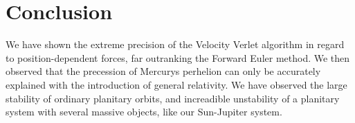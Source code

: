 \documentclass[a4paper]{article}
\begin{document}
\section{Conclusion}\label{sec:conclusion}
We have shown the extreme precision of the Velocity Verlet algorithm in regard to position-dependent forces, far outranking the Forward Euler method.
We then observed that the precession of Mercurys perhelion can only be accurately explained with the introduction of general relativity.
We have observed the large stability of ordinary planitary orbits, and increadible unstability of a planitary system with several massive objects, like our Sun-Jupiter system.

%
%

{}
\end{document}
